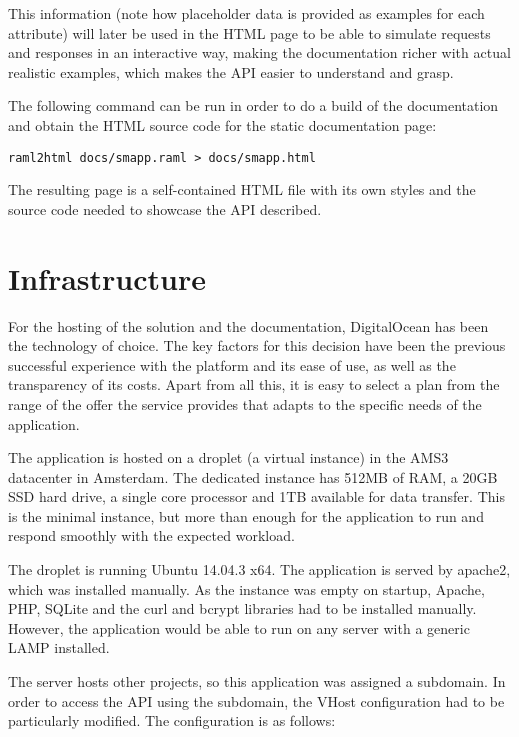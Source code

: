 This information (note how placeholder data is provided as examples for each attribute) will later be used in the HTML page to be able to simulate requests and responses in an interactive way, making the documentation richer with actual realistic examples, which makes the API easier to understand and grasp.

The following command can be run in order to do a build of the documentation and obtain the HTML source code for the static documentation page:

\begin{verbatim}
raml2html docs/smapp.raml > docs/smapp.html
\end{verbatim}

The resulting page is a self-contained HTML file with its own styles and the source code needed to showcase the API described.

\section{Infrastructure}
For the hosting of the solution and the documentation, DigitalOcean has been the technology of choice. The key factors for this decision have been the previous successful experience with the platform  and its ease of use, as well as the transparency of its costs. Apart from all this, it is easy to select a plan from the range of the offer the service provides that adapts to the specific needs of the application.

The application is hosted on a droplet (a virtual instance) in the AMS3 datacenter in Amsterdam. The dedicated instance has 512MB of RAM, a 20GB SSD hard drive, a single core processor and 1TB available for data transfer. This is the minimal instance, but more than enough for the application to run and respond smoothly with the expected workload.

The droplet is running Ubuntu 14.04.3 x64. The application is served by apache2, which was installed manually. As the instance was empty on startup, Apache, PHP, SQLite and the curl and bcrypt libraries had to be installed manually. However, the application would be able to run on any server with a generic LAMP installed.

The server hosts other projects, so this application was assigned a subdomain. In order to access the API using the subdomain, the VHost configuration had to be particularly modified. The configuration is as follows:

